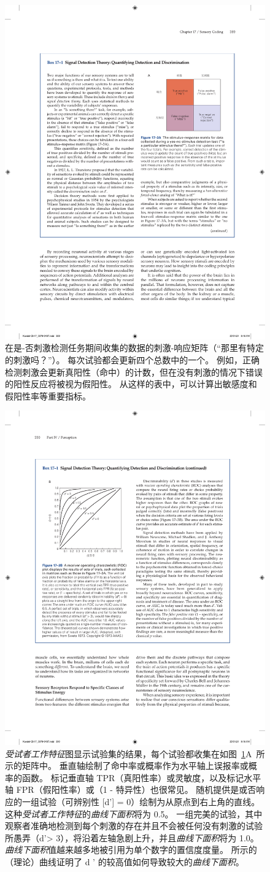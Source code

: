 \begin{figure}[htbp]
	\centering
	\includegraphics[width=0.5\linewidth]{chap17/fig_17_3_a}
	\caption{在是-否刺激检测任务期间收集的数据的刺激-响应矩阵（“那里有特定的刺激吗？”）。
		每次试验都会更新四个总数中的一个。
		例如，正确检测刺激会更新真阳性（命中）的计数，但在没有刺激的情况下错误的阳性反应将被视为假阳性。
		从这样的表中，可以计算出敏感度和假阳性率等重要指标。}
	\label{fig:17_3_a}
\end{figure}


\begin{figure}[htbp]
	\centering
	\includegraphics[width=0.5\linewidth]{chap17/fig_17_3_b}
	\caption{\textit{受试者工作特征}图显示试验集的结果，每个试验都收集在如图~\ref{fig:17_3_a}A~所示的矩阵中。
		垂直轴绘制了命中率或概率作为水平轴上误报率或概率的函数。
		标记垂直轴 TPR（真阳性率）或灵敏度，以及标记水平轴 FPR（假阳性率）或（1 - 特异性）也很常见。
		随机提供是或否响应的一组试验（可辨别性 [d'] = 0）绘制为从原点到右上角的直线。
		这种\textit{受试者工作特征}的\textit{曲线下面积}将为 0.5。
		一组完美的试验，其中观察者准确地检测到每个刺激的存在并且不会被任何没有刺激的试验所愚弄（d'> 3），将沿着左轴急剧上升，并且\textit{曲线下面积}将为 1.0。
		\textit{曲线下面积}值越来越多地被引用为单个数字的置信度度量。
		所示的（理论）曲线证明了 d ' 的较高值如何导致较大的\textit{曲线下面积}\cite{swets1973relative}。}
	\label{fig:17_3_b}
\end{figure}


